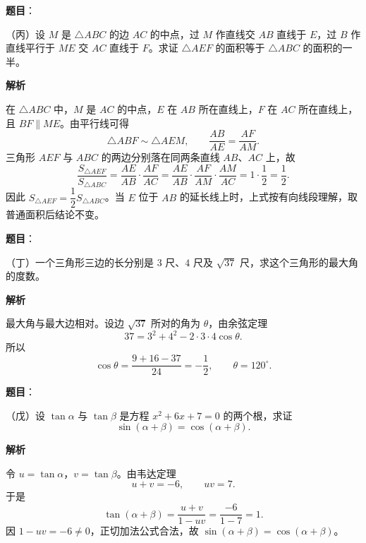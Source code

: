 \begin{answer}

\textbf{题目}：

（丙）设 $M$ 是 $\triangle ABC$ 的边 $AC$ 的中点，过 $M$ 作直线交 $AB$ 直线于 $E$，过 $B$ 作直线平行于 $ME$ 交 $AC$ 直线于 $F$。求证 $\triangle AEF$ 的面积等于 $\triangle ABC$ 的面积的一半。

\textbf{解析}
\nopagebreak[4]
\begin{center}\end{center}
\nopagebreak[4]
在 $\triangle ABC$ 中，$M$ 是 $AC$ 的中点，$E$ 在 $AB$ 所在直线上，$F$ 在 $AC$ 所在直线上，且 $BF\parallel ME$。由平行线可得
\nopagebreak[4]
\[
\triangle ABF\sim\triangle AEM,
\qquad \frac{AB}{AE}=\frac{AF}{AM}.
\]
三角形 $AEF$ 与 $ABC$ 的两边分别落在同两条直线 $AB$、$AC$ 上，故
\nopagebreak[4]
\[
\frac{S_{\triangle AEF}}{S_{\triangle ABC}}
=\frac{AE}{AB}\cdot\frac{AF}{AC}
=\frac{AE}{AB}\cdot\frac{AF}{AM}\cdot\frac{AM}{AC}
=1\cdot\frac12=\frac12.
\]
因此 $S_{\triangle AEF}=\dfrac12S_{\triangle ABC}$。当 $E$ 位于 $AB$ 的延长线上时，上式按有向线段理解，取普通面积后结论不变。


\end{answer}
\begin{answer}

\textbf{题目}：

（丁）一个三角形三边的长分别是 $3$ 尺、$4$ 尺及 $\sqrt{37}$ 尺，求这个三角形的最大角的度数。

\textbf{解析}

最大角与最大边相对。设边 $\sqrt{37}$ 所对的角为 $\theta$，由余弦定理
\nopagebreak[4]
\[
37=3^2+4^2-2\cdot3\cdot4\cos\theta.
\]
所以
\nopagebreak[4]
\[
\cos\theta=\frac{9+16-37}{24}=-\frac12,
\qquad \theta=120^\circ.
\]


\end{answer}
\begin{answer}

\textbf{题目}：

（戊）设 $\tan\alpha$ 与 $\tan\beta$ 是方程 $x^2+6x+7=0$ 的两个根，求证
\nopagebreak[4]
\[
\sin(\alpha+\beta)=\cos(\alpha+\beta).
\]

\textbf{解析}

令 $u=\tan\alpha$，$v=\tan\beta$。由韦达定理
\nopagebreak[4]
\[
u+v=-6,\qquad uv=7.
\]
于是
\nopagebreak[4]
\[
\tan(\alpha+\beta)=\frac{u+v}{1-uv}=\frac{-6}{1-7}=1.
\]
因 $1-uv=-6\neq0$，正切加法公式合法，故 $\sin(\alpha+\beta)=\cos(\alpha+\beta)$。


\end{answer}

